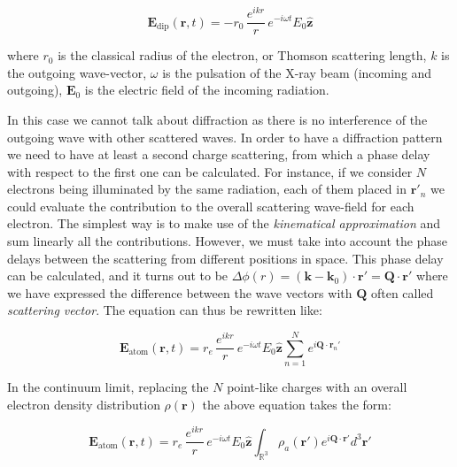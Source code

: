 \begin{equation}
    \mathbf{E}_{\text{dip}}(\mathbf{r},t) 
    = -r_0 \, \frac{e^{ikr}}{r} \, e^{-i \omega t} 
    E_0 \mathbf{\hat{z}}
    \label{eq:scattering_pointlike}
\end{equation}

where $r_0$ is the classical radius of the electron, or Thomson scattering length, $k$ is the outgoing wave-vector, $\omega$ is the pulsation of the 
X-ray beam (incoming and outgoing), $\mathbf{E}_0$ is the electric field of the incoming radiation.

In this case we cannot talk about diffraction as there is no interference of the outgoing wave with other scattered waves. In order 
to have a diffraction pattern we need to have at least a second charge scattering, from which a phase 
delay with respect to the first one can be calculated. For instance, if we consider $N$ electrons being illuminated by the 
same radiation, each of them placed in $\mathbf{r'}_n$ we could evaluate the contribution to the overall scattering 
wave-field for each electron. 
The simplest way is to make use of the \textit{kinematical approximation} and sum linearly all the contributions. However, we must 
take into account the phase delays between the scattering from different positions in space. 
This phase delay can be calculated, and it turns out to be $\Delta\phi(r) = (\mathbf k - \mathbf {k}_0)\cdot \mathbf{r}' = \mathbf Q \cdot \mathbf{r}'$ 
where we have expressed the difference between the wave vectors with $\mathbf{Q}$ often called \textit{scattering vector}.
The equation can thus be rewritten like: 

\begin{equation}
    \mathbf{E}_{\text{atom}}(\mathbf{r},t) 
    = r_e \, \frac{e^{ikr}}{r} \, e^{-i \omega t} 
    E_0 \mathbf{\hat{z}}
    \sum_{n = 1}^{N} e^{i \mathbf{Q} \cdot \mathbf{r}_n'} 
    \label{eq:scattering_electrons}
\end{equation}

In the continuum limit, replacing the $N$ point-like charges with an overall electron density distribution $\rho(\mathbf r)$ 
the above equation takes the form: 

\begin{equation}
    \mathbf{E}_{\text{atom}}(\mathbf{r},t) 
    = r_e \, \frac{e^{ikr}}{r} \, e^{-i \omega t} 
    E_0 \mathbf{\hat{z}}
    \int_{\mathbb{R}^3} \rho_a(\mathbf r') e^{i \mathbf{Q} \cdot \mathbf{r}'}  d^3 \mathbf r'
    \label{eq:scattering_atom}
\end{equation}

